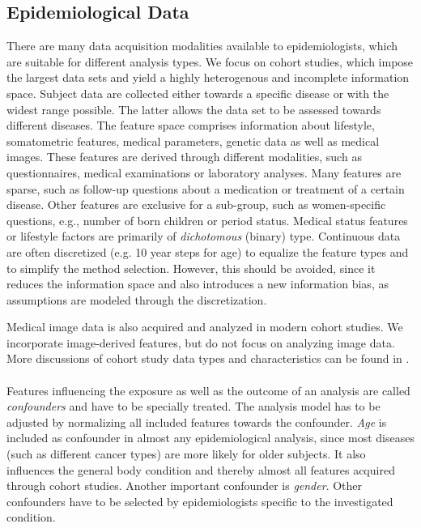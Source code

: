 \documentclass[journal]{style/vgtc} 			          %
\begin{document}
\subsection{Epidemiological Data} \label{sec:EpidemiologicalData}
There are many data acquisition modalities available to epidemiologists, which are suitable for different analysis types.
We focus on cohort studies, which impose the largest data sets and yield a highly heterogenous and incomplete information space.
Subject data are collected either towards a specific disease or with the widest range possible.
The latter allows the data set to be assessed towards different diseases.
The feature space comprises information about lifestyle, somatometric features, medical parameters, genetic data as well as medical images.
These features are derived through different modalities, such as questionnaires, medical examinations or laboratory analyses.
Many features are sparse, such as follow-up questions about a medication or treatment of a certain disease.
Other features are exclusive for a sub-group, such as women-specific questions, e.g., number of born children or period status.
Medical status features or lifestyle factors are primarily of \emph{dichotomous} (binary) type.
Continuous data are often discretized (e.g. 10 year steps for age) to equalize the feature types and to simplify the method selection.
However, this should be avoided, since it reduces the information space and also introduces a new information bias, as assumptions are modeled through the discretization.

Medical image data is also acquired and analyzed in modern cohort studies.
We incorporate image-derived features, but do not focus on analyzing image data.
More discussions of cohort study data types and characteristics can be found in \cite{Preim2014, Toennies2015}.
\\\\
Features influencing the exposure as well as the outcome of an analysis are called \emph{confounders} and have to be specially treated.
The analysis model has to be adjusted by normalizing all included features towards the confounder.
\emph{Age} is included as confounder in almost any epidemiological analysis, since most diseases (such as different cancer types) are more likely for older subjects.
It also influences the general body condition and thereby almost all features acquired through cohort studies.
Another important confounder is \emph{gender}.
Other confounders have to be selected by epidemiologists specific to the investigated condition.
\end{document}
